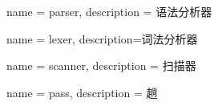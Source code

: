 {
  name = parser,
  description = {语法分析器}
}

{
  name = lexer,
  description={词法分析器}
}

{
  name = scanner,
  description = {扫描器}
}

{
  name = pass,
  description = {趟}
}